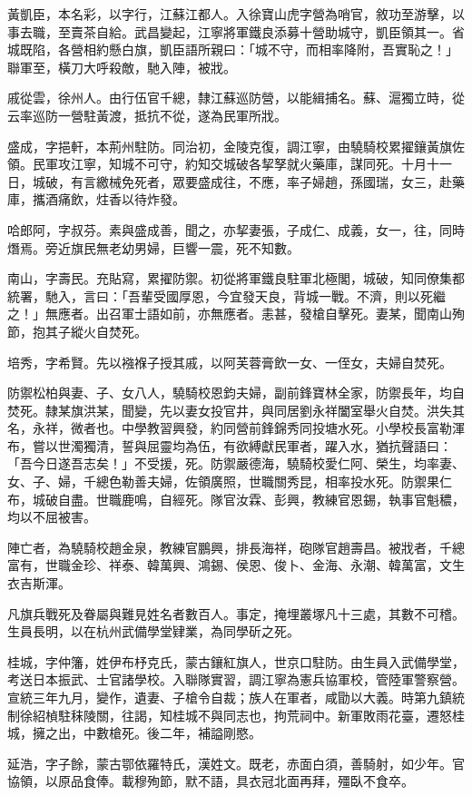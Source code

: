\begin{pinyinscope}
黃凱臣，本名彩，以字行，江蘇江都人。入徐寶山虎字營為哨官，敘功至游擊，以事去職，至賣茶自給。武昌變起，江寧將軍鐵良添募十營助城守，凱臣領其一。省城既陷，各營相約懸白旗，凱臣語所親曰：「城不守，而相率降附，吾實恥之！」聯軍至，橫刀大呼殺敵，馳入陣，被戕。

戚從雲，徐州人。由行伍官千總，隸江蘇巡防營，以能緝捕名。蘇、滬獨立時，從云率巡防一營駐黃渡，抵抗不從，遂為民軍所戕。

盛成，字挹軒，本荊州駐防。同治初，金陵克復，調江寧，由驍騎校累擢鑲黃旗佐領。民軍攻江寧，知城不可守，約知交城破各挈孥就火藥庫，謀同死。十月十一日，城破，有言繳械免死者，眾要盛成往，不應，率子婦趙，孫國瑞，女三，赴藥庫，攜酒痛飲，炷香以待炸發。

哈郎阿，字叔芬。素與盛成善，聞之，亦挈妻張，子成仁、成義，女一，往，同時熸焉。旁近旗民無老幼男婦，巨響一震，死不知數。

南山，字壽民。充貼寫，累擢防禦。初從將軍鐵良駐軍北極閣，城破，知同僚集都統署，馳入，言曰：「吾輩受國厚恩，今宜發天良，背城一戰。不濟，則以死繼之！」無應者。出召軍士語如前，亦無應者。恚甚，發槍自擊死。妻某，聞南山殉節，抱其子縱火自焚死。

培秀，字希賢。先以襁褓子授其戚，以阿芙蓉膏飲一女、一侄女，夫婦自焚死。

防禦松柏與妻、子、女八人，驍騎校恩鈞夫婦，副前鋒寶林全家，防禦長年，均自焚死。隸某旗洪某，聞變，先以妻女投官井，與同居劉永祥闔室舉火自焚。洪失其名，永祥，微者也。中學教習興發，約同營前鋒錦秀同投塘水死。小學校長富勒渾布，嘗以世濁獨清，誓與屈靈均為伍，有欲縛獻民軍者，躍入水，猶抗聲語曰：「吾今日遂吾志矣！」不受援，死。防禦嚴德海，驍騎校愛仁阿、榮生，均率妻、女、子、婦，千總色勒善夫婦，佐領廣照，世職關秀昆，相率投水死。防禦果仁布，城破自盡。世職鹿鳴，自經死。隊官汝霖、彭興，教練官恩錫，執事官魁穠，均以不屈被害。

陣亡者，為驍騎校趙金泉，教練官鵬興，排長海祥，砲隊官趙壽昌。被戕者，千總富有，世職金珍、祥泰、韓萬興、鴻錫、侯恩、俊卜、金海、永潮、韓萬富，文生衣吉斯渾。

凡旗兵戰死及眷屬與難見姓名者數百人。事定，掩埋叢塚凡十三處，其數不可稽。生員長明，以在杭州武備學堂肄業，為同學斫之死。

桂城，字仲籓，姓伊布杼克氏，蒙古鑲紅旗人，世京口駐防。由生員入武備學堂，考送日本振武、士官諸學校。入聯隊實習，調江寧為憲兵協軍校，管陸軍警察營。宣統三年九月，變作，遺妻、子槍令自裁；族人在軍者，咸勖以大義。時第九鎮統制徐紹楨駐秣陵關，往謁，知桂城不與同志也，拘荒祠中。新軍敗雨花臺，遷怒桂城，擁之出，中數槍死。後二年，補謚剛愍。

延浩，字子餘，蒙古鄂依羅特氏，漢姓文。既老，赤面白須，善騎射，如少年。官協領，以原品食俸。載穆殉節，默不語，具衣冠北面再拜，殭臥不食卒。


\end{pinyinscope}
